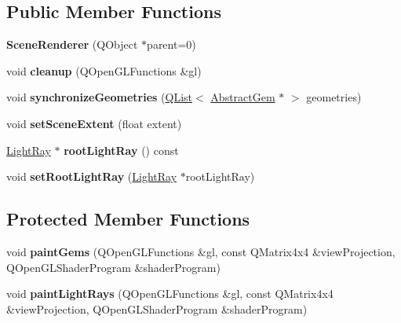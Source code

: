 \subsection*{Public Member Functions}
\begin{DoxyCompactItemize}
\item 
\hypertarget{class_scene_renderer_a12f72dc9b22e99ecdccaec38b6d2d512}{}{\bfseries Scene\+Renderer} (Q\+Object $\ast$parent=0)\label{class_scene_renderer_a12f72dc9b22e99ecdccaec38b6d2d512}

\item 
\hypertarget{class_scene_renderer_a9dc118d75160651fb925410a68fef70f}{}void {\bfseries cleanup} (Q\+Open\+G\+L\+Functions \&gl)\label{class_scene_renderer_a9dc118d75160651fb925410a68fef70f}

\item 
\hypertarget{class_scene_renderer_a0cae4e7fdd5ef1fd4d38f480521433a9}{}void {\bfseries synchronize\+Geometries} (\hyperlink{class_q_list}{Q\+List}$<$ \hyperlink{class_abstract_gem}{Abstract\+Gem} $\ast$ $>$ geometries)\label{class_scene_renderer_a0cae4e7fdd5ef1fd4d38f480521433a9}

\item 
\hypertarget{class_scene_renderer_a6596dcdb04a471f4fbcfa82eed07b9d8}{}void {\bfseries set\+Scene\+Extent} (float extent)\label{class_scene_renderer_a6596dcdb04a471f4fbcfa82eed07b9d8}

\item 
\hypertarget{class_scene_renderer_ad57b11f56edc29b4e46a9104af6efe6d}{}\hyperlink{class_light_ray}{Light\+Ray} $\ast$ {\bfseries root\+Light\+Ray} () const \label{class_scene_renderer_ad57b11f56edc29b4e46a9104af6efe6d}

\item 
\hypertarget{class_scene_renderer_a8e9b701f5b236adbe805715944d9ae8c}{}void {\bfseries set\+Root\+Light\+Ray} (\hyperlink{class_light_ray}{Light\+Ray} $\ast$root\+Light\+Ray)\label{class_scene_renderer_a8e9b701f5b236adbe805715944d9ae8c}

\end{DoxyCompactItemize}
\subsection*{Protected Member Functions}
\begin{DoxyCompactItemize}
\item 
\hypertarget{class_scene_renderer_a6a8fecf9dcfcda180e4f9d2abb0ca2e8}{}void {\bfseries paint\+Gems} (Q\+Open\+G\+L\+Functions \&gl, const Q\+Matrix4x4 \&view\+Projection, Q\+Open\+G\+L\+Shader\+Program \&shader\+Program)\label{class_scene_renderer_a6a8fecf9dcfcda180e4f9d2abb0ca2e8}

\item 
\hypertarget{class_scene_renderer_a6371e0e5c63e519fcf407f12d9d47262}{}void {\bfseries paint\+Light\+Rays} (Q\+Open\+G\+L\+Functions \&gl, const Q\+Matrix4x4 \&view\+Projection, Q\+Open\+G\+L\+Shader\+Program \&shader\+Program)\label{class_scene_renderer_a6371e0e5c63e519fcf407f12d9d47262}

\end{DoxyCompactItemize}
